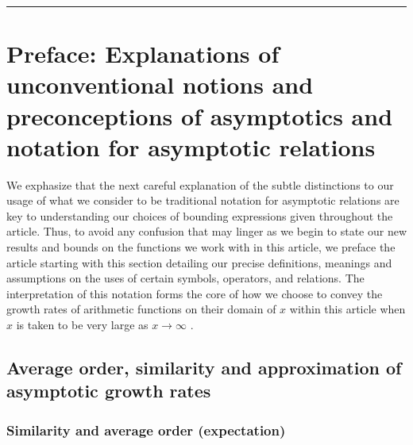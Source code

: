 \documentclass[11pt,reqno,a4letter]{article}
\numberwithin{figure}{section}
\numberwithin{table}{section}
\newcommand{\cf}{\textit{cf.\ }}
\theoremstyle{plain}
\numberwithin{theorem}{section}
\theoremstyle{definition}
\begin{document}
\bigskip\hrule\bigskip

\newpage
\label{Appendix_Glossary_NotationConvs}
     \vskip 0in
     \printglossary[type={symbols},
                    title={Reference on special notation and other conventions},
                    style={glossstyleSymbol},
                    nogroupskip=true]



\newpage
\section{Preface: Explanations of unconventional notions and preconceptions of asymptotics and 
         notation for asymptotic relations} 

We exphasize that the next careful explanation of the subtle distinctions to our usage of 
what we consider to be traditional notation for asymptotic relations are key to 
understanding our choices of bounding expressions given throughout the article. 
Thus, to avoid any confusion that may linger as we begin to state our new results and bounds on the 
functions we work with in this article, we preface the article starting with this section detailing 
our precise definitions, meanings and assumptions on the uses of certain symbols, operators, and 
relations. The interpretation of this notation forms the core of how we choose 
to convey the growth rates of arithmetic functions on their domain of $x$ within this article 
when $x$ is taken to be very large as $x \rightarrow \infty$ 
\cite[\cf \S 2]{NISTHB} \cite{ACOMB-BOOK}. 

\subsection{Average order, similarity and approximation of asymptotic growth rates} 

\subsubsection{Similarity and average order (expectation)} 
\end{document}
